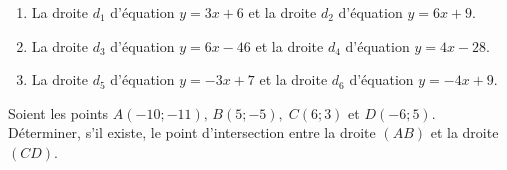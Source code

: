 {\begin{Exercice}
\begin{enumerate}[itemsep=1em]
	\item \begin{minipage}[t]{\linewidth}La droite $d_1$ d'équation $y=3x+6$ et la droite $d_2$ d'équation $y=6x+9$. \end{minipage}
	\item \begin{minipage}[t]{\linewidth}La droite $d_3$ d'équation $y=6x-46$ et la droite $d_4$ d'équation $y=4x-28$. \end{minipage}
	\item \begin{minipage}[t]{\linewidth}La droite $d_5$ d'équation $y=-3x+7$ et la droite $d_6$ d'équation $y=-4x+9$. \end{minipage}
\end{enumerate}
\end{Exercice}

\begin{Exercice}

Soient les points $A(-10;-11),\,B(5;-5), \;C(6;3)$ et $D(-6;5)$. \\
Déterminer, s'il existe, le point d'intersection entre la droite $(AB)$ et la droite $(CD)$.
\end{Exercice}

}
